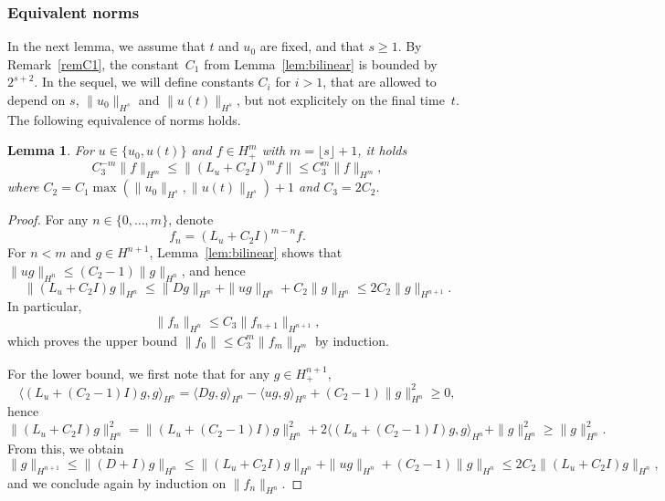 \documentclass [11pt] {article}
\newtheorem{lem}[thm]{Lemma}
\begin{document}
\subsubsection{Equivalent norms}\label{sec:equivN}

In the next lemma, we assume that $t$ and $u_0$ are fixed, and that $s\ge 1$.
By Remark~\ref{remC1}, the constant~$C_1$ from Lemma~\ref{lem:bilinear} is bounded by $2^{s+2}$. In the sequel, we will define constants $C_i$ for $i>1$, that are allowed to depend on $s$, $\|u_0\|_{H^s}$ and $\|u(t)\|_{H^s}$,
but not explicitely on the final time~$t$.
The following equivalence of norms holds.
\begin{lem}
\label{lem:LuplusC2}
For $u\in \{u_0,u(t)\}$ and $f\in H^{m}_+$ with $m=\lfloor s\rfloor+1$, it holds
\[
C_3^{-m}\|f\|_{H^{m}}\leq \|(L_u+C_2 I)^mf\| \leq C_3^m \|f\|_{H^{m}},
\]
where $C_2=C_1\max(\|u_0\|_{H^s},\|u(t)\|_{H^s})+1$ and $C_3=2C_2$.
\end{lem}
\begin{proof}
For any $n\in\{0,\dots,m\}$, denote
\[
f_n=(L_u+C_2 I)^{m-n}f.
\]
For $n<m$ and $g\in H^{n+1}$, Lemma~\ref{lem:bilinear} shows that $\|ug\|_{H^{n}}\leq (C_2-1)\|g\|_{H^n}$, and hence
\[
\|(L_u+C_2 I)g\|_{H^{n}}\leq \|Dg\|_{H^{n}}+\|ug\|_{H^{n}}+C_2\|g\|_{H^{n}}\leq 2C_2\|g\|_{H^{n+1}}.
\]
In particular,
\[
\|f_n\|_{H^n}\leq C_3\|f_{n+1}\|_{H^{n+1}},
\]
which proves the upper bound $\|f_0\|\leq C_3^m \|f_m\|_{H^{m}}$ by induction.
\newline

For the lower bound, we first note that for any $g\in H^{n+1}_+$,
\[
\langle(L_u+(C_2-1)I)g,g\rangle_{H^n} = \langle D g,g\rangle_{H^n} -\langle ug,g\rangle_{H^n}+(C_2-1)\|g\|_{H^n}^2\geq 0,
\]
hence
\[
\|(L_u+C_2I)g\|_{H^{n}}^2=\|(L_u+(C_2-1)I)g\|_{H^{n}}^2+2\langle(L_u+(C_2-1)I)g,g\rangle_{H^n} +\|g\|_{H^n}^2\geq \|g\|_{H^n}^2.
\]
From this, we obtain
\[
\|g\|_{H^{n+1}}\leq \|(D+I)g\|_{H^n}\leq \|(L_u+C_2I)g\|_{H^{n}}+\|ug\|_{H^{n}}+(C_2-1)\|g\|_{H^{n}}\leq 2C_2\|(L_u+C_2 I)g\|_{H^{n}},
\]
and we conclude again by induction on $\|f_n\|_{H^n}$.
\end{proof}
\end{document}
